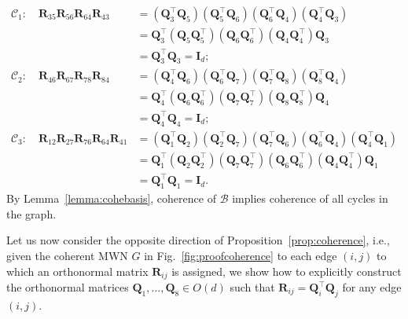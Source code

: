 \documentclass[aps,showpacs,preprintnumbers,amsmath,amssymb,twocolumn,superscriptaddress,floatfix,nofootinbib,10pt,pre]{revtex4-1}
\begin{document}
\begin{align}
\mathcal{C}_1:\quad
\mathbf{R}_{35} \mathbf{R}_{56} \mathbf{R}_{64} \mathbf{R}_{43}
&= (\mathbf{Q}_3^\top \mathbf{Q}_5)
   (\mathbf{Q}_5^\top \mathbf{Q}_6)
   (\mathbf{Q}_6^\top \mathbf{Q}_4)
   (\mathbf{Q}_4^\top \mathbf{Q}_3) \nonumber \\
&= \mathbf{Q}_3^\top
   (\mathbf{Q}_5 \mathbf{Q}_5^\top)
   (\mathbf{Q}_6 \mathbf{Q}_6^\top)
   (\mathbf{Q}_4 \mathbf{Q}_4^\top)
   \mathbf{Q}_3 \nonumber \\
&= \mathbf{Q}_3^\top \mathbf{Q}_3
 = \mathbf{I}_d;
\\[1ex]
%
\mathcal{C}_2:\quad
\mathbf{R}_{46} \mathbf{R}_{67} \mathbf{R}_{78} \mathbf{R}_{84}
&= (\mathbf{Q}_4^\top \mathbf{Q}_6)
   (\mathbf{Q}_6^\top \mathbf{Q}_7)
   (\mathbf{Q}_7^\top \mathbf{Q}_8)
   (\mathbf{Q}_8^\top \mathbf{Q}_4) \nonumber \\
&= \mathbf{Q}_4^\top
   (\mathbf{Q}_6 \mathbf{Q}_6^\top)
   (\mathbf{Q}_7 \mathbf{Q}_7^\top)
   (\mathbf{Q}_8 \mathbf{Q}_8^\top)
   \mathbf{Q}_4 \nonumber \\
&= \mathbf{Q}_4^\top \mathbf{Q}_4
 = \mathbf{I}_d;
\\[1ex]
%
\mathcal{C}_3:\quad
\mathbf{R}_{12} \mathbf{R}_{27} \mathbf{R}_{76}
\mathbf{R}_{64} \mathbf{R}_{41}
&= (\mathbf{Q}_1^\top \mathbf{Q}_2)
   (\mathbf{Q}_2^\top \mathbf{Q}_7)
   (\mathbf{Q}_7^\top \mathbf{Q}_6)
   (\mathbf{Q}_6^\top \mathbf{Q}_4)
   (\mathbf{Q}_4^\top \mathbf{Q}_1) \nonumber \\
&= \mathbf{Q}_1^\top
   (\mathbf{Q}_2 \mathbf{Q}_2^\top)
   (\mathbf{Q}_7 \mathbf{Q}_7^\top)
   (\mathbf{Q}_6 \mathbf{Q}_6^\top)
   (\mathbf{Q}_4 \mathbf{Q}_4^\top)
   \mathbf{Q}_1 \nonumber \\
&= \mathbf{Q}_1^\top \mathbf{Q}_1
 = \mathbf{I}_d.
\end{align}
By Lemma~\ref{lemma:cohebasis}, coherence of $\mathcal{B}$ implies coherence of all cycles in the graph. 

Let us now consider the opposite direction of Proposition~\ref{prop:coherence}, i.e., given the coherent MWN $G$ in Fig.~\ref{fig:proofcoherence} to each edge $(i,j)$ to which an orthonormal matrix $\mathbf R_{ij}$ is assigned, we show how to explicitly construct the orthonormal matrices $\mathbf{Q}_1, \ldots, \mathbf{Q}_8 \in O(d)$ such that $\mathbf R_{ij}=\mathbf Q_i^\top\mathbf Q_j$ for any edge $(i,j)$.
\end{document}
